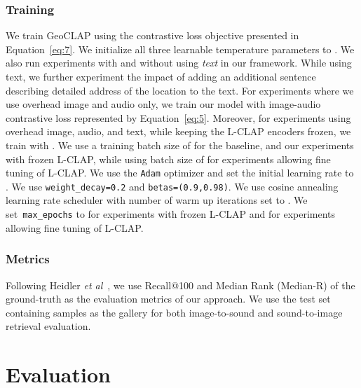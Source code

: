 \documentclass{bmvc2k}
\def\etal{\emph{et al}\bmvaOneDot}
\begin{document}
\subsubsection{Training}
We train GeoCLAP using the contrastive loss objective presented in Equation~\ref{eq:7}. We initialize all three learnable temperature parameters to . We also run experiments with and without using \textit{text} in our framework. While using text, we further experiment the impact of adding an additional sentence describing detailed address of the location to the text. For experiments where we use overhead image and audio only, we train our model with image-audio contrastive loss represented by Equation~\ref{eq:5}. Moreover, for experiments using overhead image, audio, and text, while keeping the L-CLAP encoders frozen, we train with . We use a training batch size of  for the baseline, and our experiments with frozen L-CLAP, while using batch size of  for experiments allowing fine tuning of L-CLAP. We use the \texttt{Adam} optimizer and set the initial learning rate to . We use \texttt{weight\_decay=0.2} and \texttt{betas=(0.9,0.98)}. We use cosine annealing learning rate scheduler with number of warm up iterations set to . We set~\texttt{max\_epochs} to  for experiments with frozen L-CLAP and  for experiments allowing fine tuning of L-CLAP. 

\subsubsection{Metrics}
Following Heidler \etal~\cite{heidler2023self}, we use Recall@100 and Median Rank (Median-R) of the ground-truth as the evaluation metrics of our approach. We use the test set containing  samples as the gallery for both image-to-sound and sound-to-image retrieval evaluation.

\section{Evaluation}
\label{sec:evaluation}
\end{document}
